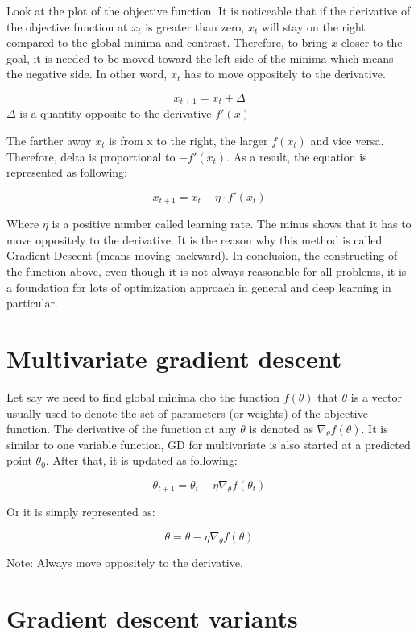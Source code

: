 	Look at the plot of the objective function. It is noticeable that if the derivative of the objective function at $x_t$ is greater than zero, $x_t$ will stay on the right compared to the global minima and contrast. Therefore, to bring $x$ closer to the goal, it is needed to be moved toward the left side of the minima which means the negative side. In other word, $x_t$ has to move oppositely to the derivative.  
	
	\[x_{t+1} = x_t + \Delta \] $\Delta$ is a quantity opposite to the derivative $f'(x)$
	
	\noindent	
	The farther away $x_t$ is from x to the right, the larger $f(x_t)$ and vice versa. Therefore, delta is proportional to $-f'(x_t)$.
	\noindent	
	As a result, the equation is represented as following:
	
	\[x_{t+1} = x_t - \eta \cdot f'(x_t)\]
	
	Where $\eta$ is a positive number called learning rate. The minus shows that it has to move oppositely to the derivative. It is the reason why this method is called Gradient Descent (means moving backward). In conclusion, the constructing of the function above, even though it is not always reasonable for all problems, it is a foundation for lots of optimization approach in general and deep learning in particular.
	
	\section{Multivariate gradient descent}
	\noindent
	
	Let say we need to find global minima cho the function $f(\theta)$ that $\theta$ is a vector usually used to denote the set of parameters (or weights) of the objective function. The derivative of the function at any $\theta$ is denoted as $\nabla_{\theta}f(\theta)$. It is similar to one variable function, GD for multivariate is also started at a predicted point $\theta_0$. After that, it is updated as following:
	
	\[\theta_{t+1} = \theta_t - \eta\nabla_{\theta}f(\theta_t) \]
	
	\noindent	
	Or it is simply represented as:
	
	\[\theta = \theta - \eta\nabla_{\theta}f(\theta) \]
	
	\noindent
	Note: Always move oppositely to the derivative.
	
\section{Gradient descent variants}
	\label{section:GDvariants}
	\noindent
	
